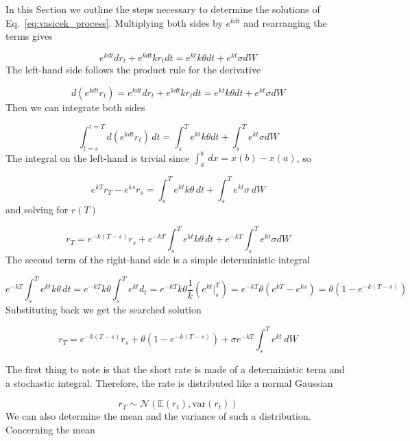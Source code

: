 In this Section we outline the steps necessary to determine the solutions of Eq.~\ref{eq:vasicek_process}.
Multiplying both sides by \(e^{kdt}\) and rearranging the terms gives

\begin{equation*}
e^{kdt}dr_t + e^{kdt}kr_t dt = e^{kt}k\theta dt + e^{kt}\sigma dW
\end{equation*}
The left-hand side follows the product rule for the derivative

\begin{equation*}
d(e^{kdt}r_t) = e^{kdt}dr_t + e^{kdt}kr_t dt= e^{kt}k\theta dt + e^{kt}\sigma dW
\end{equation*}
Then we can integrate both sides

\begin{equation*}
\int^{t=T}_{t=s} d(e^{kdt}r_t)\,dt = \int^T_s e^{kt}k\theta dt +\int^T_s e^{kt}\sigma dW
\end{equation*}
The integral on the left-hand is trivial since \(\int^b_a\,dx = x(b)-x(a)\), so

\begin{equation*}
e^{kT}r_T - e^{ks}r_s = \int^T_s e^{kt}k\theta\,dt +\int^T_s e^{kt}\sigma\,dW
\end{equation*}
and solving for $r(T)$

\begin{equation*}
r_T=e^{-k(T-s)}r_s+ e^{-kT}\int^T_s e^{kt}k\theta\,dt +e^{-kT}\int^T_s e^{kt}\sigma dW
\end{equation*}
The second term of the right-hand side is a simple deterministic integral

\begin{equation*}
e^{-kT}\int^T_s e^{kt}k\theta\,dt=e^{-kT}k\theta\int^T_s e^{kt}d_t=e^{-kT}k\theta\frac{1}{k}(e^{kt}|^T_s)= e^{-kT}\theta(e^{kT}-e^{ks})=\theta\left(1-e^{-k(T-s)}\right)
\end{equation*}
Substituting back we get the searched solution

\begin{equation}
r_T=e^{-k(T-s)} r_s+\theta(1-e^{-k(T-s)})+ \sigma e^{-kT}\int^T_s e^{kt}\,dW
\end{equation}

The first thing to note is that the short rate is made of a deterministic term
and a stochastic integral.
Therefore, the rate is distributed like a normal Gaussian

\begin{equation*}
r_T \sim \mathcal{N}(\mathbb{E}(r_t), \textrm{var}(r_t))
\end{equation*}
We can also determine the mean and the variance of such a distribution.
Concerning the mean


